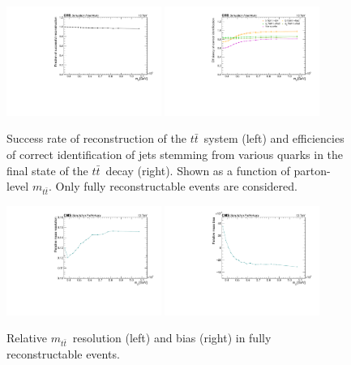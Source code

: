 \begin{figure}
  \centering
  \includegraphics[width=0.45\textwidth]{fig/chapt5/perf/recoSuccess.pdf}
  \includegraphics[width=0.45\textwidth]{fig/chapt5/perf/recoEff.pdf}
  \caption{Success rate of reconstruction of the $t\bar t$~system (left) and efficiencies of correct identification of jets stemming from various quarks in the final state of the $t\bar t$~decay (right). Shown as a function of parton-level $m_{t\bar t}$. Only fully reconstructable events are considered.}
  \label{Fig:TTRefoEff}
\end{figure}

\begin{figure}
  \centering
  \includegraphics[width=0.45\textwidth]{fig/chapt5/perf/resolution.pdf}
  \includegraphics[width=0.45\textwidth]{fig/chapt5/perf/bias.pdf}
  \caption{Relative $m_{t\bar t}$~resolution (left) and bias (right) in fully reconstructable events.}
  \label{Fig:TTRecoMttPerf}
\end{figure}

